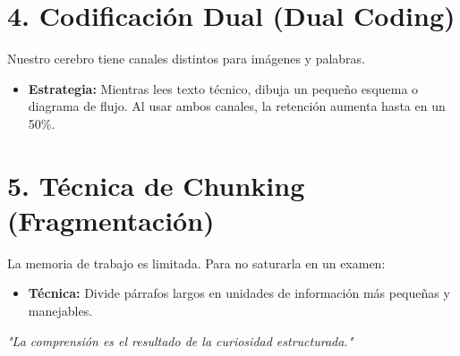 \documentclass[12pt,a4paper]{article}
\begin{document}
\section{4. Codificación Dual (Dual Coding)}
Nuestro cerebro tiene canales distintos para imágenes y palabras. 
\begin{itemize}
    \item \textbf{Estrategia:} Mientras lees texto técnico, dibuja un pequeño esquema o diagrama de flujo. Al usar ambos canales, la retención aumenta hasta en un 50\%.
\end{itemize}

\section{5. Técnica de Chunking (Fragmentación)}
La memoria de trabajo es limitada. Para no saturarla en un examen:
\begin{itemize}
    \item \textbf{Técnica:} Divide párrafos largos en unidades de información más pequeñas y manejables.
\end{itemize}

\vspace{1cm}
\begin{center}
    \textit{"La comprensión es el resultado de la curiosidad estructurada."}
\end{center}
\end{document}
